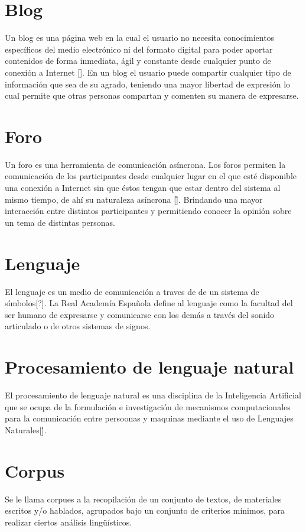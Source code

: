 \section{Blog}

Un blog es una página web en la cual el usuario no necesita conocimientos específicos del medio electrónico ni del formato digital para poder aportar contenidos de forma inmediata, ágil y constante desde cualquier punto de conexión a Internet [\:]. En un blog el usuario puede compartir cualquier tipo de información que sea de su agrado, teniendo una mayor libertad de expresión lo cual permite que otras personas compartan y comenten su manera de expresarse.

\section{Foro}

Un foro es una herramienta de comunicación asíncrona. Los  foros permiten la comunicación de los participantes desde cualquier lugar en el que  esté  disponible  una  conexión  a Internet  sin  que  éstos  tengan  que  estar dentro del sistema al mismo tiempo, de ahí su naturaleza asíncrona [\=]. Brindando una mayor interacción entre distintos participantes y permitiendo conocer la opinión sobre un tema de distintas personas.


\section{Lenguaje}

El lenguaje es un medio de comunicación a traves de de un sistema de símbolos[?].
La Real Academía Española define al lenguaje como la facultad del ser humano de expresarse y comunicarse con los demás a través del sonido articulado o de otros sistemas de signos.

\section{Procesamiento de lenguaje natural}

El procesamiento de lenguaje natural es una disciplina de la Inteligencia Artificial que se ocupa de la formulación e investigación de mecanismos computacionales para la comunicación entre persoonas y maquinas mediante el uso de Lenguajes Naturales[\'].

\section{Corpus}

Se le llama corpues a la recopilación de un conjunto de textos, de materiales escritos y/o hablados, agrupados bajo un conjunto de criterios mínimos, para realizar ciertos análisis lingüísticos.
